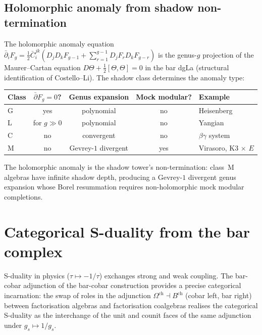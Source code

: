 \subsection{Holomorphic anomaly from shadow non-termination}
\label{subsec:hol-anomaly-shadow}

\begin{proposition}
\label{prop:shadow-anomaly-type}
The holomorphic anomaly equation $\bar\partial_i F_g = \frac{1}{2} \bar{C}^{jk}_i(D_j D_k F_{g-1} + \sum_{r=1}^{g-1} D_j F_r D_k F_{g-r})$ is the genus-$g$ projection of the Maurer--Cartan equation $D\Theta + \frac{1}{2}[\Theta,\Theta] = 0$ in the bar dgLa \textup{(}structural identification of Costello--Li\textup{)}. The shadow class determines the anomaly type:
\begin{center}
\renewcommand{\arraystretch}{1.2}
\small
\begin{tabular}{lcccl}
 \toprule
 Class & $\bar\partial F_g = 0$? & Genus expansion & Mock modular? & Example \\
 \midrule
 G & yes & polynomial & no & Heisenberg \\
 L & for $g \gg 0$ & polynomial & no & Yangian \\
 C & no & convergent & no & $\beta\gamma$ system \\
 M & no & Gevrey-$1$ divergent & yes & Virasoro, K3$\,\times\,E$ \\
 \bottomrule
\end{tabular}
\end{center}
The holomorphic anomaly is the shadow tower's non-termination: class~M
algebras have infinite shadow depth, producing a Gevrey-$1$ divergent
genus expansion whose Borel resummation requires non-holomorphic mock
modular completions.
\end{proposition}


\section{Categorical S-duality from the bar complex}
\label{sec:categorical-s-duality}

S-duality in physics ($\tau \mapsto -1/\tau$) exchanges strong and weak coupling. The bar-cobar adjunction of the bar-cobar construction provides a precise categorical incarnation: the swap of roles in the adjunction $\Omega^{\mathrm{ch}} \dashv B^{\mathrm{ch}}$ (cobar left, bar right) between factorisation algebras and factorisation coalgebras realises the categorical S-duality as the interchange of the unit and counit faces of the same adjunction under $g_s \mapsto 1/g_s$.

